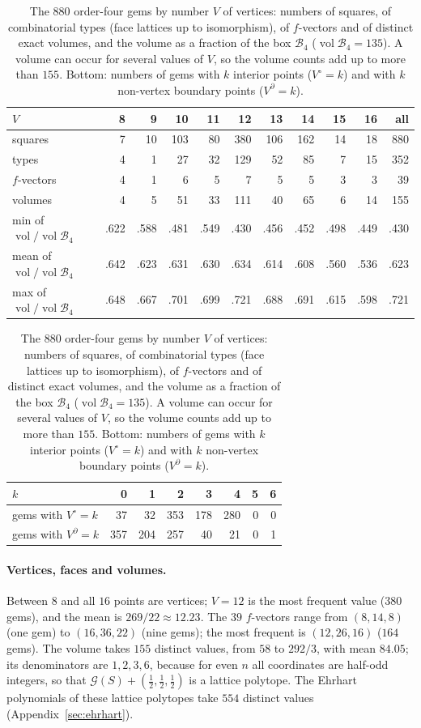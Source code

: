 \documentclass[11pt,a4paper]{article}
\theoremstyle{plain}
\theoremstyle{definition}
\theoremstyle{remark}
\begin{document}
\begin{table}[htbp]
\centering
\caption{The $880$ order-four gems by number $V$ of vertices: numbers of squares, of combinatorial types (face lattices up to isomorphism), of $f$-vectors and of distinct exact volumes, and the volume as a fraction of the box $\mathcal B_4$ ($\operatorname{vol}\mathcal B_4=135$). A volume can occur for several values of $V$, so the volume counts add up to more than $155$. Bottom: numbers of gems with $k$ interior points ($V^\circ=k$) and with $k$ non-vertex boundary points ($V^\partial=k$).}
\label{tab:census}
\footnotesize
\begin{tabular}{l rrrrrrrrr r}
\toprule
$V$ & 8 & 9 & 10 & 11 & 12 & 13 & 14 & 15 & 16 & all\\
\midrule
squares & 7 & 10 & 103 & 80 & 380 & 106 & 162 & 14 & 18 & 880\\
types   & 4 & 1 & 27 & 32 & 129 & 52 & 85 & 7 & 15 & 352\\
$f$-vectors & 4 & 1 & 6 & 5 & 7 & 5 & 5 & 3 & 3 & 39\\
volumes & 4 & 5 & 51 & 33 & 111 & 40 & 65 & 6 & 14 & 155\\
\addlinespace[2pt]
min of $\operatorname{vol}/\operatorname{vol}\mathcal B_4$ & .622 & .588 & .481 & .549 & .430 & .456 & .452 & .498 & .449 & .430\\
mean of $\operatorname{vol}/\operatorname{vol}\mathcal B_4$ & .642 & .623 & .631 & .630 & .634 & .614 & .608 & .560 & .536 & .623\\
max of $\operatorname{vol}/\operatorname{vol}\mathcal B_4$ & .648 & .667 & .701 & .699 & .721 & .688 & .691 & .615 & .598 & .721\\
\bottomrule
\end{tabular}

\medskip
\begin{tabular}{l rrrrrrr}
\toprule
$k$ & 0 & 1 & 2 & 3 & 4 & 5 & 6\\
\midrule
gems with $V^\circ=k$ & 37 & 32 & 353 & 178 & 280 & 0 & 0\\
gems with $V^\partial=k$ & 357 & 204 & 257 & 40 & 21 & 0 & 1\\
\bottomrule
\end{tabular}
\end{table}

\paragraph{Vertices, faces and volumes.}
Between $8$ and all $16$ points are vertices; $V=12$ is the most frequent value ($380$ gems), and the mean is $269/22\approx12.23$.
The $39$ $f$-vectors range from $(8,14,8)$ (one gem) to $(16,36,22)$ (nine gems); the most frequent is $(12,26,16)$ ($164$ gems).
The volume takes $155$ distinct values, from $58$ to $292/3$, with mean $84.05$; its denominators are $1,2,3,6$, because for even $n$ all coordinates are half-odd integers, so that $\mathcal G(S)+(\frac12,\frac12,\frac12)$ is a lattice polytope.
The Ehrhart polynomials of these lattice polytopes take $554$ distinct values (Appendix~\ref{sec:ehrhart}).
\end{document}
